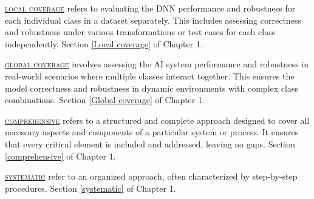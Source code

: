   
 


  \textsc{\hyperref[Local coverage]{\textsc{local coverage}}}
  refers to evaluating the DNN performance and robustness for each individual class in a dataset separately. This includes assessing  correctness and robustness under various transformations or test cases for each class independently. Section \ref{Local coverage} of Chapter 1.

  \textsc{\hyperref[Global coverage]{\textsc{global coverage}}}
  involves assessing the AI system performance and robustness in real-world scenarios where multiple classes interact together. This ensures the model correctness and robustness in dynamic environments with complex class combinations. Section \ref{Global coverage} of Chapter 1.


\textsc{\hyperref[comprehensive]{\textsc{comprehensive}}}  refers to a structured and complete approach designed to cover all necessary aspects and components of a particular system or process. It ensures that every critical element is included and addressed, leaving no gaps. Section \ref{comprehensive} of Chapter 1.
  
\textsc{\hyperref[systematic]{\textsc{systematic}}} refer to an organized approach, often characterized by step-by-step procedures. Section \ref{systematic} of Chapter 1.





